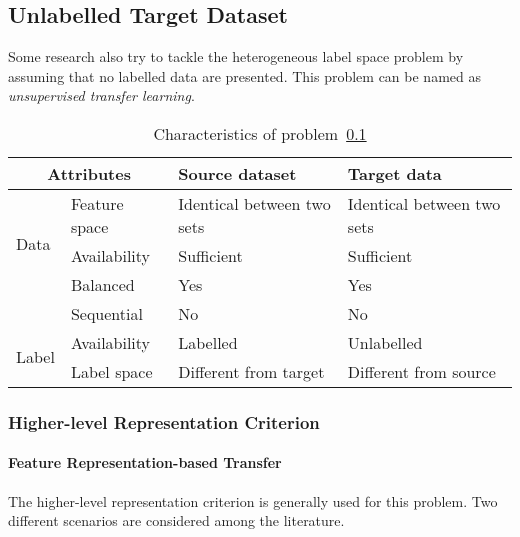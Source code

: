 \documentclass[prodmode]{acmsmall}  %
\begin{document}
\subsection{Unlabelled Target Dataset}
\label{sec:HETELunsup}
Some research also try to tackle the heterogeneous label space problem by assuming that no labelled data are presented. This problem can be named as \textit{unsupervised transfer learning}.
\begin{table}[htbp!]
\caption{Characteristics of problem~\ref{sec:HETELunsup}}
\label{tab:HETELunsup}
\begin{center}
\begin{small}
\begin{tabular}{|p{1cm}<{\centering}|m{2.5cm}<{\centering}|m{4.3cm}<{\centering}|m{4.3cm}<{\centering}|}
\hline
\multicolumn{2}{|c|}{Attributes} & Source dataset & Target data \\
\hline \hline
\multirow{3}{*}{Data} & Feature space & Identical between two sets & Identical between two sets \\ 
\cline{2-4}{} & Availability & Sufficient & Sufficient \\
\cline{2-4}{} & Balanced & Yes & Yes \\
\cline{2-4}{} & Sequential & No & No \\
\hline \hline
\multirow{2}{*}{Label} & Availability & Labelled & {\color{red}Unlabelled} \\
\cline{2-4}{}  & Label space & Different from target & {\color{red}Different from source} \\ 
\hline
\end{tabular}
\end{small}
\end{center}
\end{table}
\subsubsection{Higher-level Representation Criterion}
\paragraph{Feature Representation-based Transfer} 
The higher-level representation criterion is generally used for this problem. Two different scenarios are considered among the literature. 
\end{document}
